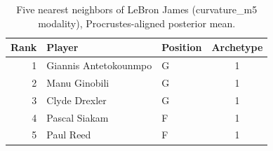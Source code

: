 \begin{table}[htbp]
  \centering\small
  \begin{tabular}{rllc}
    \toprule
    Rank & Player & Position & Archetype \\
    \midrule
    1 & Giannis Antetokounmpo & G & 1 \\
    2 & Manu Ginobili & G & 1 \\
    3 & Clyde Drexler & G & 1 \\
    4 & Pascal Siakam & F & 1 \\
    5 & Paul Reed & F & 1 \\
    \bottomrule
  \end{tabular}
  \caption{Five nearest neighbors of LeBron James (curvature_m5 modality), Procrustes-aligned posterior mean.}
  \label{tab:LeBron_James_neighbors_curvature_m5}
\end{table}

